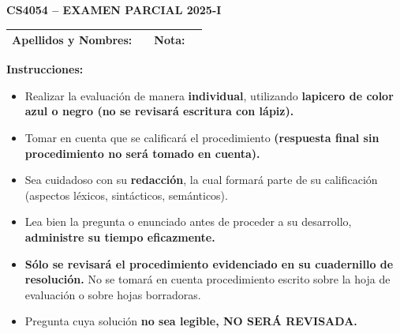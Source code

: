 \documentclass[10pt,a4paper]{article}
\begin{document}
\begin{center}
  {\Large\bfseries CS4054 -- EXAMEN PARCIAL 2025-I}\\[6pt]
  \renewcommand{\arraystretch}{1.6}
  \begin{tabularx}{\linewidth}{|>{\bfseries}l|X|>{\bfseries}l|p{1.6cm}|}
    \hline
    Apellidos y Nombres: & & Nota: & \\ \hline
  \end{tabularx}
\end{center}

\textbf{Instrucciones:}
\begin{itemize}\small\itshape
  \item Realizar la evaluación de manera \textbf{individual}, utilizando \textbf{lapicero de color azul o negro (no se revisará escritura con lápiz).}
  \item Tomar en cuenta que se calificará el procedimiento \textbf{(respuesta final sin procedimiento no será tomado en cuenta).}
  \item Sea cuidadoso con su \textbf{redacción}, la cual formará parte de su calificación (aspectos léxicos, sintácticos, semánticos).
  \item Lea bien la pregunta o enunciado antes de proceder a su desarrollo, \textbf{administre su tiempo eficazmente.}
  \item \textbf{Sólo se revisará el procedimiento evidenciado en su cuadernillo de resolución.} No se tomará en cuenta procedimiento escrito sobre la hoja de evaluación o sobre hojas borradoras.
  \item Pregunta cuya solución \textbf{no sea legible, NO SERÁ REVISADA.}
\end{itemize}
\end{document}

